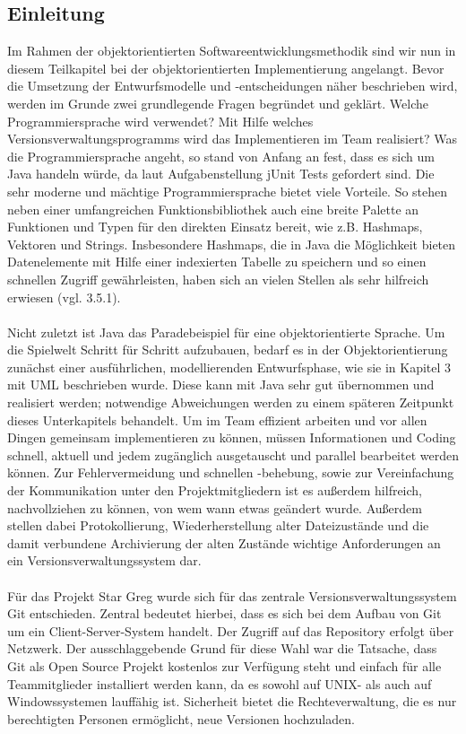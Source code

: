 \subsection{Einleitung}
\label{sub:fachkonzept-implementierung-einleitung}

Im Rahmen der objektorientierten Softwareentwicklungsmethodik sind wir nun in diesem Teilkapitel bei der objektorientierten Implementierung angelangt. Bevor die Umsetzung der Entwurfsmodelle und -entscheidungen näher beschrieben wird, werden im Grunde zwei grundlegende Fragen begründet und geklärt. Welche Programmiersprache wird verwendet? Mit Hilfe welches Versionsverwaltungsprogramms wird das Implementieren im Team realisiert?
Was die Programmiersprache angeht, so stand von Anfang an fest, dass es sich um Java handeln würde, da laut Aufgabenstellung jUnit Tests gefordert sind. Die sehr moderne und mächtige Programmiersprache bietet viele Vorteile. So stehen neben einer umfangreichen Funktionsbibliothek auch eine breite Palette an Funktionen und Typen für den direkten Einsatz bereit, wie z.B. Hashmaps, Vektoren und Strings. Insbesondere Hashmaps, die in Java die Möglichkeit bieten Datenelemente mit Hilfe einer indexierten Tabelle zu speichern und so einen schnellen Zugriff gewährleisten, haben sich an vielen Stellen als sehr hilfreich erwiesen (vgl. 3.5.1). 
\\
\\
Nicht zuletzt ist Java das Paradebeispiel für eine objektorientierte Sprache. Um die Spielwelt Schritt für Schritt aufzubauen, bedarf es in der Objektorientierung zunächst einer ausführlichen, modellierenden Entwurfsphase, wie sie in Kapitel 3 mit UML beschrieben wurde. Diese kann mit Java sehr gut übernommen und realisiert werden; notwendige Abweichungen werden zu einem späteren Zeitpunkt dieses Unterkapitels behandelt. 
Um im Team effizient arbeiten und vor allen Dingen gemeinsam implementieren zu können, müssen Informationen und Coding schnell, aktuell und jedem zugänglich ausgetauscht und parallel bearbeitet werden können. Zur Fehlervermeidung und schnellen -behebung, sowie zur Vereinfachung der Kommunikation unter den Projektmitgliedern ist es außerdem hilfreich, nachvollziehen zu können, von wem wann etwas geändert wurde. Außerdem stellen dabei Protokollierung, Wiederherstellung alter Dateizustände und die damit verbundene Archivierung der alten Zustände wichtige Anforderungen an ein Versionsverwaltungssystem dar. 
\\
\\
Für das Projekt Star Greg wurde sich für das zentrale Versionsverwaltungssystem Git entschieden. Zentral bedeutet hierbei, dass es sich bei dem Aufbau von Git um ein Client-Server-System handelt. Der Zugriff auf das Repository erfolgt über Netzwerk. Der ausschlaggebende Grund für diese Wahl war die Tatsache, dass Git als Open Source Projekt kostenlos zur Verfügung steht und einfach für alle Teammitglieder installiert werden kann, da es sowohl auf UNIX- als auch auf Windowssystemen lauffähig ist. Sicherheit bietet die Rechteverwaltung, die es nur berechtigten Personen ermöglicht, neue Versionen hochzuladen. 

